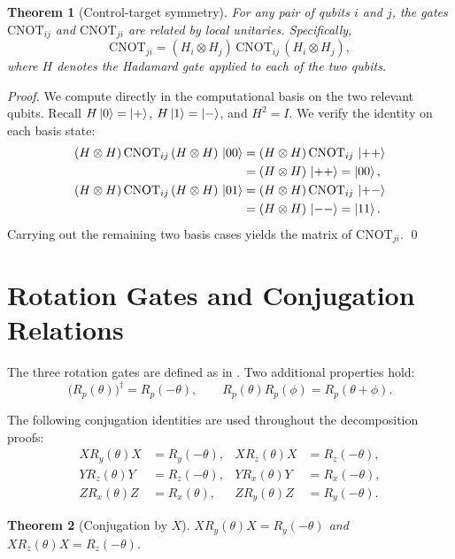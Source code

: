 \documentclass[12pt, a4paper, oneside]{report}
\theoremstyle{plain}
\newtheorem{theorem}{Theorem}[chapter]
\theoremstyle{definition}
\theoremstyle{remark}
\newcommand{\CNOT}{\mathrm{CNOT}}
\newcommand{\Rx}{R_x}
\newcommand{\Ry}{R_y}
\newcommand{\Rz}{R_z}
\begin{document}
\begin{theorem}[Control-target symmetry]
\label{thm:ctrl-target}
For any pair of qubits $i$ and $j$, the gates $\CNOT_{ij}$ and $\CNOT_{ji}$ are related by
local unitaries. Specifically,
\[
  \CNOT_{ji} = (H_i \otimes H_j)\,\CNOT_{ij}\,(H_i \otimes H_j),
\]
where $H$ denotes the Hadamard gate applied to each of the two qubits.
\end{theorem}

\begin{proof}
We compute directly in the computational basis on the two relevant qubits. Recall
$H\ket{0}=\ket{+}$, $H\ket{1}=\ket{-}$, and $H^2=I$. We verify the identity on each basis
state:
\begin{align*}
  (H\otimes H)\,\CNOT_{ij}\,(H\otimes H)\,\ket{00}
    &= (H\otimes H)\,\CNOT_{ij}\,\ket{++} \\
    &= (H\otimes H)\,\ket{++} = \ket{00}, \\
  (H\otimes H)\,\CNOT_{ij}\,(H\otimes H)\,\ket{01}
    &= (H\otimes H)\,\CNOT_{ij}\,\ket{+-} \\
    &= (H\otimes H)\,\ket{--} = \ket{11}.
\end{align*}
Carrying out the remaining two basis cases yields the matrix of $\CNOT_{ji}$. \qed
\end{proof}

\section{Rotation Gates and Conjugation Relations}

The three rotation gates are defined as in . Two additional properties hold:
\[
  \bigl(R_p(\theta)\bigr)^\dagger = R_p(-\theta), \qquad
  R_p(\theta)R_p(\phi) = R_p(\theta+\phi).
\]

The following conjugation identities are used throughout the decomposition proofs:
\begin{align}
  X\Ry(\theta)X &= \Ry(-\theta), & X\Rz(\theta)X &= \Rz(-\theta), \label{eq:conjX}\\
  Y\Rz(\theta)Y &= \Rz(-\theta), & Y\Rx(\theta)Y &= \Rx(-\theta), \label{eq:conjY}\\
  Z\Rx(\theta)Z &= \Rx(\theta),  & Z\Ry(\theta)Z &= \Ry(-\theta). \label{eq:conjZ}
\end{align}

\begin{theorem}[Conjugation by $X$]
\label{thm:conjX}
$X\Ry(\theta)X = \Ry(-\theta)$ and $X\Rz(\theta)X = \Rz(-\theta)$.
\end{theorem}
\end{document}
